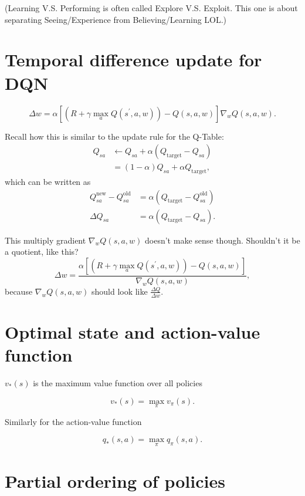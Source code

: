 \documentclass[17pt]{extarticle}
\theoremstyle{plain}
\theoremstyle{definition}
\theoremstyle{remark}
\newcommand{\0}{\varnothing}
\newcommand{\<}{\langle}
\renewcommand{\>}{\rangle}
\begin{document}
(Learning V.S. Performing is often called Explore V.S. Exploit. This one is about separating Seeing/Experience from Believing/Learning LOL.)

\section{Temporal difference update for DQN}

$$
\Delta w = \alpha \left[ \left( R + \gamma \max _ { a } Q \left( s ^ { \prime } , a , w \right) \right) - Q ( s , a , w ) \right] \nabla _ { w } Q ( s , a , w ).
$$

Recall how this is similar to the update rule for the Q-Table:
\begin{align*}
Q_{sa} &\gets Q_{sa} + \alpha (Q_{\text{target}} - Q_{sa}) \\
&= (1 - \alpha) Q_{sa} + \alpha Q_{\text{target}},
\end{align*}
which can be written as
\begin{align*}
Q^{\text{new}}_{sa} - Q^{\text{old}}_{sa} &= \alpha (Q_{\text{target}} - Q^{\text{old}}_{sa}) \\
\Delta Q_{sa} &= \alpha (Q_{\text{target}} - Q_{sa}).
\end{align*}

This multiply gradient $ \nabla _ { w } Q ( s , a , w ) $ doesn't make sense though. Shouldn't it be a quotient, like this?
$$
\Delta w = \frac{\alpha \left[ \left( R + \gamma \max _ { a } Q \left( s ^ { \prime } , a , w \right) \right) - Q ( s , a , w ) \right]}{\nabla _ { w } Q ( s , a , w )},
$$
because $ \nabla _ { w } Q ( s , a , w ) $ should look like $ \frac{\Delta Q }{\Delta w}. $

\section{Optimal state and action-value function}

\( v _ { * } ( s ) \) is the maximum value function over all policies

\[
v _ { * } ( s ) = \max _ { \pi } v _ { \pi } ( s ).
\]

Similarly for the action-value function

\[
q _ { * } ( s , a ) = \max _ { \pi } q _ { \pi } ( s , a ).
\]

\section{Partial ordering of policies}
\end{document}
